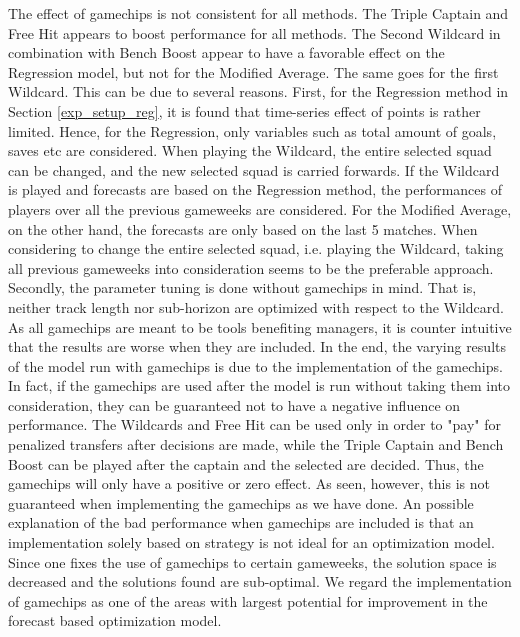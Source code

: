 The effect of gamechips is not consistent for all methods. The Triple Captain and Free Hit appears to boost performance for all methods. The Second Wildcard in combination with Bench Boost appear to have a favorable effect on the Regression model, but not for the Modified Average. The same goes for the first Wildcard. This can be due to several reasons. First, for the Regression method in Section \ref{exp_setup_reg}, it is found that time-series effect of points is rather limited. Hence, for the Regression, only variables such as total amount of goals, saves etc are considered. When playing the Wildcard, the entire selected squad can be changed, and the new selected squad is carried forwards. If the Wildcard is played and forecasts are based on the Regression method, the performances of players over all the previous gameweeks are considered. For the Modified Average, on the other hand, the forecasts are only based on the last 5 matches. When considering to change the entire selected squad, i.e. playing the Wildcard, taking  all previous gameweeks into consideration seems to be the preferable approach. Secondly, the parameter tuning is done without gamechips in mind. That is, neither track length nor sub-horizon are optimized with respect to the Wildcard. As all gamechips are meant to be tools benefiting managers, it is  counter intuitive that the results are worse when they are included. In the end, the varying results of the model run with gamechips is due to the implementation of the gamechips. In fact, if the gamechips are used after the model is run without taking them into consideration, they can be guaranteed not to have a negative influence on performance. The Wildcards and Free Hit can be used only in order to "pay" for penalized transfers after decisions are made, while the Triple Captain and Bench Boost can be played after the captain and the selected are decided. Thus, the gamechips will only have a positive or zero effect. As seen, however, this is not guaranteed when implementing the gamechips as we have done. An possible explanation of the bad performance when gamechips are included is that an implementation solely based on strategy is not ideal for an optimization model. Since one fixes the use of gamechips to certain gameweeks, the solution space is decreased and the solutions found are sub-optimal. We regard the implementation of gamechips as one of the areas with largest potential for improvement in the forecast based optimization model.

